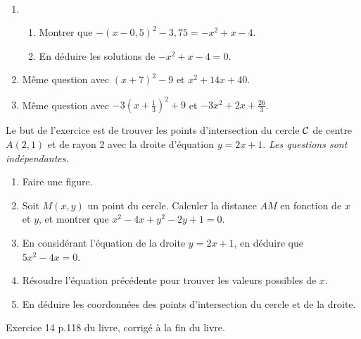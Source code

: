 \documentclass[11pt]{article}
\begin{document}
\begin{exercice}~
  \begin{enumerate}
    \item
      \begin{enumerate}
        \item Montrer que $-(x-0,5)^2-3,75=-x^2+x-4$.
        \item En déduire les solutions de $-x^2+x-4=0$.
      \end{enumerate}
    \item Même question avec $(x+7)^2-9$ et $x^2+14x+40$.
    \item Même question avec $-3(x+\frac{1}{3})^2+9$ et $-3x^2+2x+\frac{26}{3}$.
  \end{enumerate}
\end{exercice}

\begin{exercice}[Géométrie]Le but de l'exercice est de trouver les points d'intersection du cercle $\cal C$ de centre $A(2,1)$ et de rayon 2 avec la droite d'équation $y=2x+1$. \emph{Les questions sont indépendantes.}
  \begin{enumerate}
    \item Faire une figure.
    \item Soit $M(x,y)$ un point du cercle. Calculer la distance $AM$ en fonction de $x$ et $y$, et montrer que $x^2-4x+y^2-2y+1=0$.
    \item En considérant l'équation de la droite $y=2x+1$, en déduire que $5x^2-4x=0$.
    \item Résoudre l'équation précédente pour trouver les valeurs possibles de $x$.
    \item En déduire les coordonnées des points d'intersection du cercle et de la droite.
  \end{enumerate}
\end{exercice}

\begin{exercice}[Problème]Exercice 14 p.118 du livre, corrigé à la fin du livre.
\end{exercice}
\end{document}
